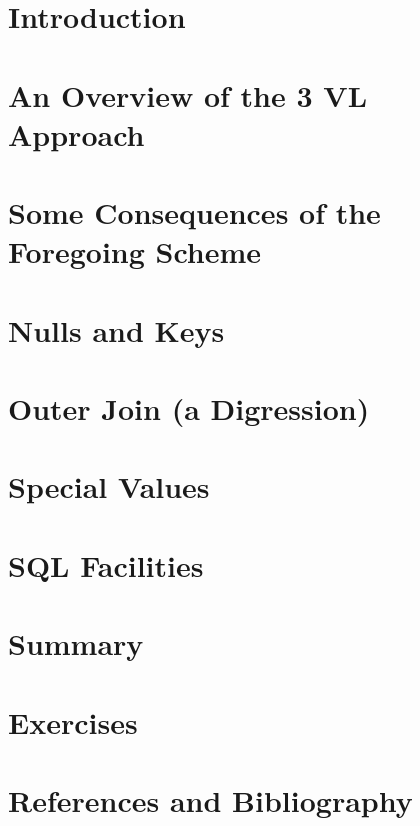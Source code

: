 \documentclass{book}
\begin{document}
\section{Introduction}

\section{An Overview of the 3 VL Approach}

\section{Some Consequences of the Foregoing Scheme}

\section{Nulls and Keys}

\section{Outer Join (a Digression)}

\section{Special Values}

\section{SQL Facilities}

\section{Summary}

\section{Exercises}

\section{References and Bibliography}
\end{document}
